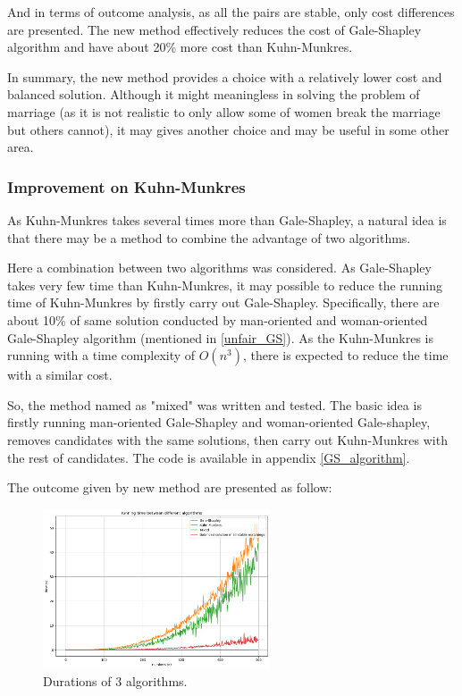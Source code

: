 \documentclass[14pt]{extarticle}
\begin{document}
And in terms of outcome analysis, as all the pairs are stable, only cost differences are presented. 
The new method effectively reduces the cost of Gale-Shapley algorithm and have about 20\% more cost than Kuhn-Munkres.

In summary, the new method provides a choice with a relatively lower cost and balanced solution. 
Although it might meaningless in solving the problem of marriage (as it is not realistic to only allow some of women break the marriage but others cannot), it may gives another choice and may be useful in some other area.

\subsubsection{Improvement on Kuhn-Munkres}

As Kuhn-Munkres takes several times more than Gale-Shapley, a natural idea is that there may be a method to combine the advantage of two algorithms.

Here a combination between two algorithms was considered. 
As Gale-Shapley takes very few time than Kuhn-Munkres, it may possible to reduce the running time of Kuhn-Munkres by firstly carry out Gale-Shapley.
Specifically, there are about 10\% of same solution conducted by man-oriented and woman-oriented Gale-Shapley algorithm (mentioned in \ref{unfair_GS}). 
As the Kuhn-Munkres is running with a time complexity of $O(n^3)$, there is expected to reduce the time with a similar cost.

So, the method named as "mixed" was written and tested. 
The basic idea is firstly running man-oriented Gale-Shapley and woman-oriented Gale-shapley, removes candidates with the same solutions, 
then carry out Kuhn-Munkres with the rest of candidates.
The code is available in appendix \ref{GS_algorithm}.

The outcome given by new method are presented as follow:

\begin{figure}[H]
  \centering
  \includegraphics[width=0.6\textwidth]{running time mixed all.png}
  \caption{Durations of 3 algorithms.}
\end{figure} 
\end{document}
